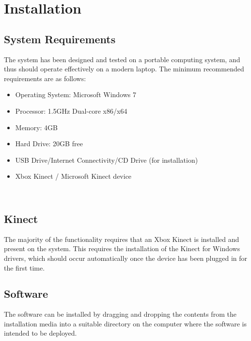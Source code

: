 \section*{Installation}

\subsection*{System Requirements}
The system has been designed and tested on a portable computing system, and thus should operate effectively on a modern laptop. The minimum recommended requirements are as follows: \\

\begin{itemize}
    \item Operating System: Microsoft Windows 7
    \item Processor: 1.5GHz Dual-core x86/x64
    \item Memory: 4GB
    \item Hard Drive: 20GB free
    \item USB Drive/Internet Connectivity/CD Drive (for installation)
    \item Xbox Kinect / Microsoft Kinect device
\end{itemize} \\

\subsection*{Kinect}
The majority of the functionality requires that an Xbox Kinect is installed and present on the system. This requires the installation of the Kinect for Windows drivers, which should occur automatically once the device has been plugged in for the first time. 

\subsection*{Software}
The software can be installed by dragging and dropping the contents from the installation media into a suitable directory on the computer where the software is intended to be deployed. %